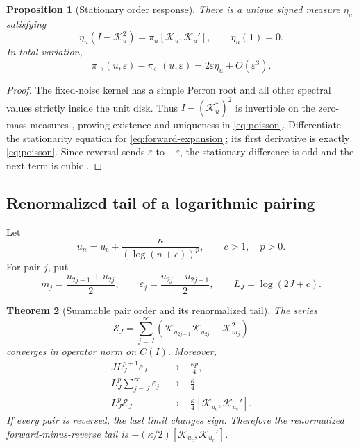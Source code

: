 \documentclass[11pt]{article}
\newtheorem{theorem}{Theorem}[section]
\newtheorem{proposition}[theorem]{Proposition}
\theoremstyle{definition}
\theoremstyle{remark}
\newcommand{\cK}{\mathcal K}
\newcommand{\cE}{\mathcal E}
\newcommand{\uc}{u_{\mathrm c}}
\newcommand{\one}{\mathbf 1}
\begin{document}
\begin{proposition}[Stationary order response]
\label{prop:stationary-response}
There is a unique signed measure $\eta_u$ satisfying
\begin{equation}\label{eq:poisson}
 \eta_u(I-\cK_u^2)=\pi_u[\cK_u,\cK_u'],
 \qquad \eta_u(\one)=0.
\end{equation}
In total variation,
\begin{equation}\label{eq:stationary-expansion}
 \pi_\to(u,\varepsilon)-\pi_\leftarrow(u,\varepsilon)
 =2\varepsilon\eta_u+O(\varepsilon^3).
\end{equation}
\end{proposition}

\begin{proof}
The fixed-noise kernel has a simple Perron root and all other spectral values
strictly inside the unit disk.  Thus $I-(\cK_u^*)^2$ is invertible on the
zero-mass measures \citep{Seneta2006,WangCycleSpectrum2026}, proving existence
and uniqueness in \eqref{eq:poisson}.  Differentiate the stationarity equation
for \eqref{eq:forward-expansion}; its first derivative is exactly
\eqref{eq:poisson}.  Since reversal sends $\varepsilon$ to $-\varepsilon$, the
stationary difference is odd and the next term is cubic
\citep{Kato1995}.
\end{proof}

\subsection{Renormalized tail of a logarithmic pairing}

Let
\begin{equation}\label{eq:schedule}
 u_n=\uc+\frac{\kappa}{(\log(n+c))^p},
 \qquad c>1,\quad p>0.
\end{equation}
For pair $j$, put
\begin{equation}\label{eq:pair-coordinates}
 m_j=\frac{u_{2j-1}+u_{2j}}2,
 \qquad
 \varepsilon_j=\frac{u_{2j}-u_{2j-1}}2,
 \qquad
 L_J=\log(2J+c).
\end{equation}

\begin{theorem}[Summable pair order and its renormalized tail]
\label{thm:pair-tail}
The series
\begin{equation}\label{eq:tail-operator}
 \cE_J=\sum_{j=J}^{\infty}
 \left(\cK_{u_{2j-1}}\cK_{u_{2j}}-\cK_{m_j}^2\right)
\end{equation}
converges in operator norm on $C(I)$.  Moreover,
\begin{align}
 J L_J^{p+1}\varepsilon_J&\longrightarrow-\frac{\kappa p}{4},
 \label{eq:increment-limit}\\
 L_J^p\sum_{j=J}^{\infty}\varepsilon_j
 &\longrightarrow-\frac{\kappa}{4},\label{eq:scalar-tail}\\
 L_J^p\cE_J
 &\longrightarrow-\frac{\kappa}{4}
 [\cK_{\uc},\cK_{\uc}'].
 \label{eq:operator-tail}
\end{align}
If every pair is reversed, the last limit changes sign.  Therefore the
renormalized forward-minus-reverse tail is
$-(\kappa/2)[\cK_{\uc},\cK_{\uc}']$.
\end{theorem}
\end{document}
